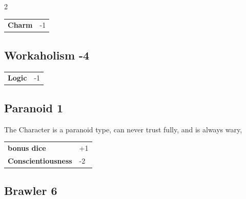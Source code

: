 \begin{multicols}{2}
\begin{tcolorbox}
\begin{tabular}{@{}ll@{}}
    \textbf{Charm} & -1\\
\end{tabular}


\end{tcolorbox}

\begin{tcolorbox}
    \subsection*{Workaholism \hfill \small{-4 }}
    \tcblower




\begin{tabular}{@{}ll@{}}
    \textbf{Logic} & -1\\
\end{tabular}


\end{tcolorbox}

\begin{tcolorbox}
    \subsection*{Paranoid \hfill \small{1 }}
    \tcblower
The Character is a paranoid type, can never trust fully, and is always wary,


\vspace{3mm}

\begin{tabular}{@{}ll@{}}
    \textbf{bonus dice} & +1\\
    \textbf{Conscientiousness} & -2\\
\end{tabular}


\end{tcolorbox}

\begin{tcolorbox}
    \subsection*{Brawler \hfill \small{6 }}
    \tcblower





\end{tcolorbox}
\end{multicols}
